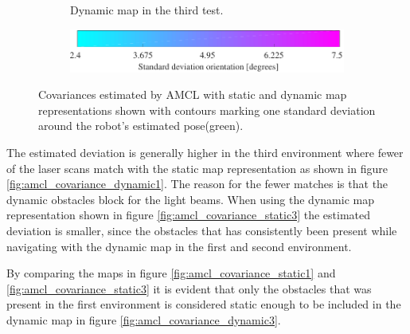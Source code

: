 \begin{figure}[htbp]
\begin{subfigure}[t]{0.45\linewidth}
        \caption{Dynamic map in the third test.}
    \end{subfigure}
    
	\begin{subfigure}[t]{1.0\linewidth}
        \centering
        \hspace{9mm}
		\includegraphics[scale=1]{chapters/evaluation/figures/precision_bar-crop}
	\end{subfigure}
   	\caption{Covariances estimated by AMCL with static and dynamic map representations shown with contours marking one standard deviation around the robot's estimated pose(green).}
\end{figure}

The estimated deviation is generally higher in the third environment where fewer of the laser scans match with the static map representation as shown in figure \ref{fig:amcl_covariance_dynamic1}. 
The reason for the fewer matches is that the dynamic obstacles block for the light beams. 
When using the dynamic map representation shown in figure \ref{fig:amcl_covariance_static3} the estimated deviation is smaller, since the obstacles that has consistently been present while navigating with the dynamic map in the first and second environment.

By comparing the maps in figure  \ref{fig:amcl_covariance_static1} and \ref{fig:amcl_covariance_static3} it is evident that only the obstacles that was present in the first environment is considered static enough to be included in the dynamic map in figure \ref{fig:amcl_covariance_dynamic3}.

